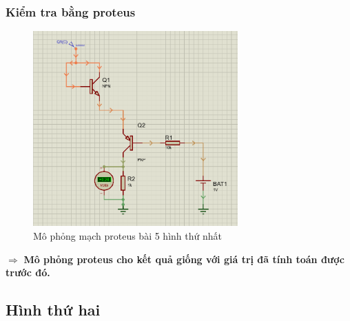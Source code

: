     \subsubsection{Kiểm tra bằng proteus}
    \begin{figure}[H]
        \centering
        \includegraphics[width=0.7\textwidth]{pictures/result5_a.png}
        \caption{Mô phỏng mạch proteus bài 5 hình thứ nhất}
    \end{figure}
    $\Rightarrow$ \textbf{Mô phỏng proteus cho kết quả giống với giá trị đã tính toán được trước đó.}\\
    \cleardoublepage
    \subsection{Hình thứ hai}
